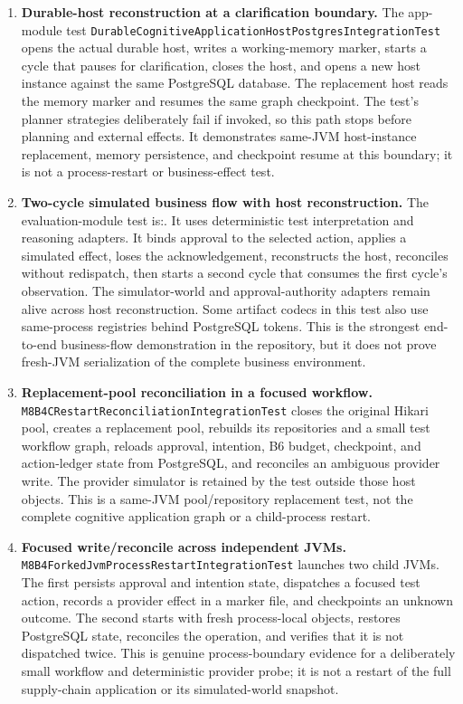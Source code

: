 \begin{enumerate}
  \item \textbf{Durable-host reconstruction at a clarification boundary.} The app-module test \texttt{DurableCognitive\allowbreak{}ApplicationHost\allowbreak{}Postgres\allowbreak{}IntegrationTest} opens the actual durable host, writes a working-memory marker, starts a cycle that pauses for clarification, closes the host, and opens a new host instance against the same PostgreSQL database. The replacement host reads the memory marker and resumes the same graph checkpoint. The test's planner strategies deliberately fail if invoked, so this path stops before planning and external effects. It demonstrates same-JVM host-instance replacement, memory persistence, and checkpoint resume at this boundary; it is not a process-restart or business-effect test.
  \item \textbf{Two-cycle simulated business flow with host reconstruction.} The evaluation-module test is:. It uses deterministic test interpretation and reasoning adapters. It binds approval to the selected action, applies a simulated effect, loses the acknowledgement, reconstructs the host, reconciles without redispatch, then starts a second cycle that consumes the first cycle's observation. The simulator-world and approval-authority adapters remain alive across host reconstruction. Some artifact codecs in this test also use same-process registries behind PostgreSQL tokens. This is the strongest end-to-end business-flow demonstration in the repository, but it does not prove fresh-JVM serialization of the complete business environment.
  \item \textbf{Replacement-pool reconciliation in a focused workflow.} \texttt{M8B4C}\allowbreak\texttt{Restart}\allowbreak\texttt{Reconciliation}\allowbreak\texttt{IntegrationTest} closes the original Hikari pool, creates a replacement pool, rebuilds its repositories and a small test workflow graph, reloads approval, intention, B6 budget, checkpoint, and action-ledger state from PostgreSQL, and reconciles an ambiguous provider write. The provider simulator is retained by the test outside those host objects. This is a same-JVM pool/repository replacement test, not the complete cognitive application graph or a child-process restart.
  \item \textbf{Focused write/reconcile across independent JVMs.} \texttt{M8B4}\allowbreak\texttt{ForkedJvm}\allowbreak\texttt{ProcessRestart}\allowbreak\texttt{IntegrationTest} launches two child JVMs. The first persists approval and intention state, dispatches a focused test action, records a provider effect in a marker file, and checkpoints an unknown outcome. The second starts with fresh process-local objects, restores PostgreSQL state, reconciles the operation, and verifies that it is not dispatched twice. This is genuine process-boundary evidence for a deliberately small workflow and deterministic provider probe; it is not a restart of the full supply-chain application or its simulated-world snapshot.

\end{enumerate}
